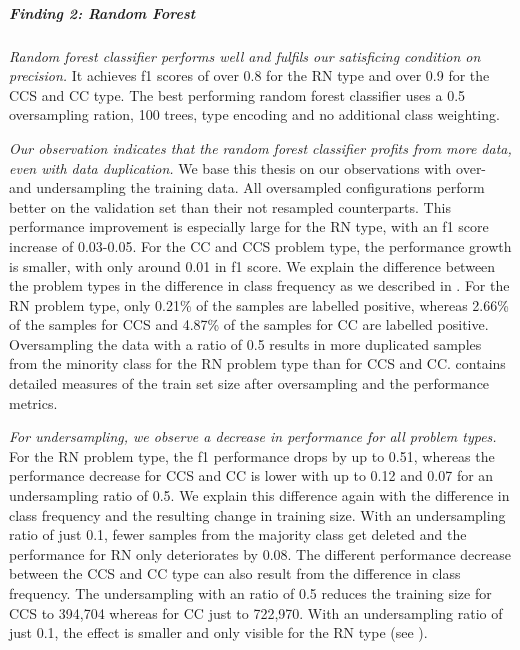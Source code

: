 \subparagraph{Finding 2: Random Forest}
\textit{Random forest classifier performs well and fulfils our satisficing condition on precision.} It achieves f1 scores of over 0.8 for the RN type and over 0.9 for the CCS and CC type.
The best performing random forest classifier uses a 0.5 oversampling ration, 100 trees, type encoding and no additional class weighting.


\textit{Our observation indicates that the random forest classifier profits from more data, even with data duplication.} We base this thesis on our observations with over- and undersampling the training data. 
All oversampled configurations perform better on the validation set than their not resampled counterparts. This performance improvement is especially large for the RN type, with an f1 score increase of 0.03-0.05. For the CC and CCS problem type, the performance growth is smaller, with only around 0.01 in f1 score. We explain the difference between the problem types in the difference in class frequency as we described in . For the RN problem type, only 0.21\% of the samples are labelled positive, whereas 2.66\% of the samples for CCS and 4.87\% of the samples for CC are labelled positive. Oversampling the data with a ratio of 0.5 results in more duplicated samples from the minority class for the RN problem type than for CCS and CC.  contains detailed measures of the train set size after oversampling and the performance metrics.

\textit{For undersampling, we observe a decrease in performance for all problem types.} For the RN problem type, the f1 performance drops by up to 0.51, whereas the performance decrease for CCS and CC is lower with up to 0.12 and 0.07 for an undersampling ratio of 0.5. We explain this difference again with the difference in class frequency and the resulting change in training size. With an undersampling ratio of just 0.1, fewer samples from the majority class get deleted and the performance for RN only deteriorates by 0.08.
The different performance decrease between the CCS and CC type can also result from the difference in class frequency. The undersampling with an ratio of 0.5 reduces the training size for CCS to 394,704 whereas for CC just to 722,970. With an undersampling ratio of just 0.1, the effect is smaller and only visible for the RN type (see ).


